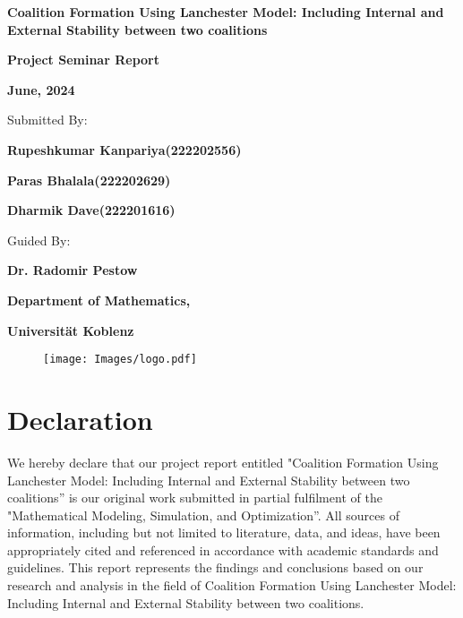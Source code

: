 \documentclass[oneside,12pt]{report}
\begin{document}
\thispagestyle{empty}
	
	\begin{center}

		{\huge \textbf{Coalition Formation Using Lanchester Model: Including Internal and External Stability between two coalitions} \par}
	\vspace{2cm}

	{\LARGE \textbf {Project Seminar Report}  \par}
        {\Large \textbf {June, 2024} \par}
	\vspace{1.2cm}

        {\large Submitted By:\par}
	{\Large \textbf {Rupeshkumar Kanpariya(222202556)} \par}
        {\Large \textbf {Paras Bhalala(222202629)} \par}
        {\Large \textbf {Dharmik Dave(222201616)} \par}
	\vspace{0.8cm}
 
	{\large Guided By:\par}
	{\Large \textbf {Dr. Radomir Pestow} \par}
	\vspace{2cm}

        {\Large \textbf {Department of Mathematics,}\par}
        {\Large \textbf {Universität Koblenz}\par}
        \vspace{0.5cm}
	\begin{figure}[h]
		\centering
		\texttt{[image: Images/logo.pdf]}
		\label{fig:uk-fb3-logo-cmyk}
	\end{figure}
	\end{center}


\newpage
	\pagestyle{plain}

	\section*{Declaration}
	\vspace{0.5cm}
		{We hereby declare that our project report entitled "Coalition Formation Using Lanchester Model: Including Internal and External Stability between two coalitions” is our original work submitted in partial fulfilment of the  "Mathematical Modeling, Simulation, and Optimization”. All sources of information, including but not limited to literature, data, and ideas, have been appropriately cited and referenced in accordance with academic standards and guidelines. This report represents the findings and conclusions based on our research and analysis in the field of Coalition Formation Using Lanchester Model: Including Internal and External Stability between two coalitions.  \par}
		
\end{document}
